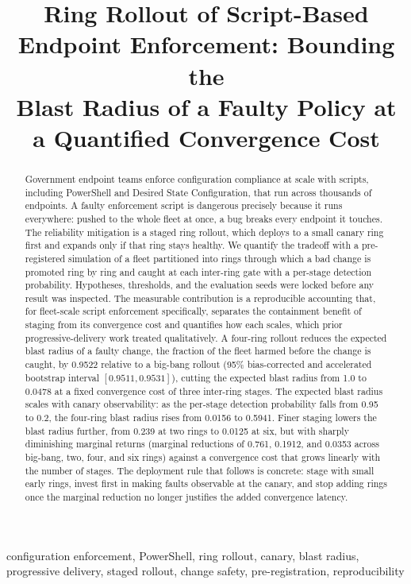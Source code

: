 \documentclass[journal]{IEEEtran}
\title{Ring Rollout of Script-Based Endpoint Enforcement: Bounding the\\
Blast Radius of a Faulty Policy at a Quantified Convergence Cost}
\author{%
  \IEEEauthorblockN{Harshavardhan Malla}
  \IEEEauthorblockA{Independent Researcher\\
  Email: harshavardhanmalla75@gmail.com}%
}
\begin{document}
\maketitle

\begin{abstract}
Government endpoint teams enforce configuration compliance at scale with scripts, including
PowerShell and Desired State Configuration, that run across thousands of endpoints. A faulty
enforcement script is dangerous precisely because it runs everywhere: pushed to the whole fleet at
once, a bug breaks every endpoint it touches. The reliability mitigation is a staged ring rollout,
which deploys to a small canary ring first and expands only if that ring stays healthy. We quantify
the tradeoff with a pre-registered simulation of a fleet partitioned into rings through which a bad
change is promoted ring by ring and caught at each inter-ring gate with a per-stage detection
probability. Hypotheses, thresholds, and the evaluation seeds were locked before any result was
inspected. The measurable contribution is a reproducible accounting that, for fleet-scale script
enforcement specifically, separates the containment benefit of staging from its convergence cost and
quantifies how each scales, which prior progressive-delivery work treated qualitatively. A four-ring
rollout reduces the expected blast radius of a faulty change, the fraction of
the fleet harmed before the change is caught, by 0.9522 relative to a big-bang rollout (95\%
bias-corrected and accelerated bootstrap interval $[0.9511, 0.9531]$), cutting the expected blast
radius from 1.0 to 0.0478 at a fixed convergence cost of three inter-ring stages. The expected blast
radius scales with canary observability: as the per-stage detection probability falls from 0.95 to
0.2, the four-ring blast radius rises from 0.0156 to 0.5941. Finer staging lowers the blast radius
further, from 0.239 at two rings to 0.0125 at six, but with sharply diminishing marginal returns
(marginal reductions of 0.761, 0.1912, and 0.0353 across big-bang, two, four, and six rings) against
a convergence cost that grows linearly with the number of stages. The deployment rule that follows
is concrete: stage with small early rings, invest first in making faults observable at the canary,
and stop adding rings once the marginal reduction no longer justifies the added convergence latency.
\end{abstract}

\begin{IEEEkeywords}
configuration enforcement, PowerShell, ring rollout, canary, blast radius, progressive delivery,
staged rollout, change safety, pre-registration, reproducibility
\end{IEEEkeywords}
\end{document}

